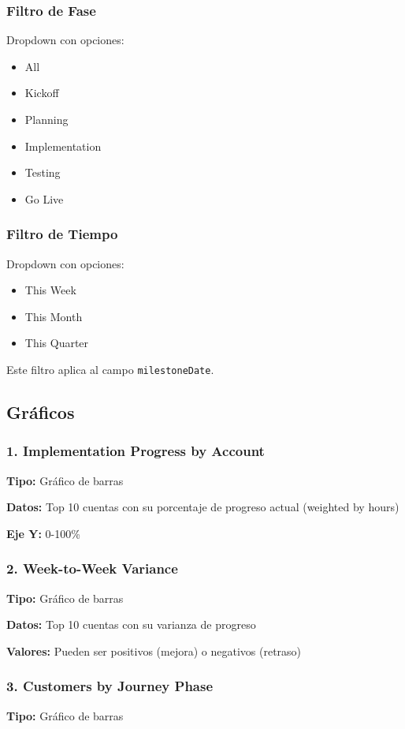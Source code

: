 \documentclass[12pt,a4paper]{article}
\begin{document}
\subsubsection{Filtro de Fase}
Dropdown con opciones:
\begin{itemize}
    \item All
    \item Kickoff
    \item Planning
    \item Implementation
    \item Testing
    \item Go Live
\end{itemize}

\subsubsection{Filtro de Tiempo}
Dropdown con opciones:
\begin{itemize}
    \item This Week
    \item This Month
    \item This Quarter
\end{itemize}

Este filtro aplica al campo \texttt{milestoneDate}.

\subsection{Gráficos}

\subsubsection{1. Implementation Progress by Account}
\textbf{Tipo:} Gráfico de barras

\textbf{Datos:} Top 10 cuentas con su porcentaje de progreso actual (weighted by hours)

\textbf{Eje Y:} 0-100\%

\subsubsection{2. Week-to-Week Variance}
\textbf{Tipo:} Gráfico de barras

\textbf{Datos:} Top 10 cuentas con su varianza de progreso

\textbf{Valores:} Pueden ser positivos (mejora) o negativos (retraso)

\subsubsection{3. Customers by Journey Phase}
\textbf{Tipo:} Gráfico de barras
\end{document}
